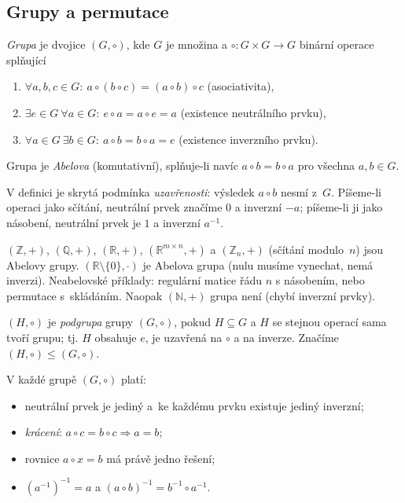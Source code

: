 \documentclass[11pt,a4paper]{article}
\begin{document}
\subsection{Grupy a permutace}

\begin{definice}[Grupa]
\emph{Grupa} je dvojice $(G,\circ)$, kde $G$ je množina a $\circ:G\times G\to G$ binární operace splňující
\begin{enumerate}[label=(\arabic*)]
  \item $\forall a,b,c\in G:\ a\circ(b\circ c)=(a\circ b)\circ c$ \quad (asociativita),
  \item $\exists e\in G\ \forall a\in G:\ e\circ a=a\circ e=a$ \quad (existence neutrálního prvku),
  \item $\forall a\in G\ \exists b\in G:\ a\circ b=b\circ a=e$ \quad (existence inverzního prvku).
\end{enumerate}
Grupa je \emph{Abelova} (komutativní), splňuje-li navíc $a\circ b=b\circ a$ pro všechna $a,b\in G$.
\end{definice}

\begin{intuice}
V definici je skrytá podmínka \emph{uzavřenosti}: výsledek $a\circ b$ nesmí  z~$G$. Píšeme-li operaci jako sčítání, neutrální prvek značíme $0$ a inverzní $-a$; píšeme-li ji jako násobení, neutrální prvek je $1$ a inverzní $a^{-1}$.
\end{intuice}

\begin{priklad}
$(\mathbb{Z},+)$, $(\mathbb{Q},+)$, $(\mathbb{R},+)$, $(\mathbb{R}^{m\times n},+)$ a $(\mathbb{Z}_n,+)$ (sčítání modulo~$n$) jsou Abelovy grupy. $(\mathbb{R}\setminus\{0\},\cdot)$ je Abelova grupa (nulu musíme vynechat, nemá inverzi). Neabelovské příklady: regulární matice řádu $n$ s násobením, nebo permutace s~skládáním. Naopak $(\mathbb{N},+)$ grupa není (chybí inverzní prvky).
\end{priklad}

\begin{definice}[Podgrupa]
$(H,\circ)$ je \emph{podgrupa} grupy $(G,\circ)$, pokud $H\subseteq G$ a $H$ se stejnou operací sama tvoří grupu; tj. $H$ obsahuje $e$, je uzavřená na $\circ$ a na inverze. Značíme $(H,\circ)\le(G,\circ)$.
\end{definice}

\begin{veta}
V každé grupě $(G,\circ)$ platí:
\begin{itemize}
  \item neutrální prvek je jediný a~ke každému prvku existuje jediný inverzní;
  \item \emph{krácení}: $a\circ c=b\circ c\Rightarrow a=b$;
  \item rovnice $a\circ x=b$ má právě jedno řešení;
  \item $(a^{-1})^{-1}=a$ a $(a\circ b)^{-1}=b^{-1}\circ a^{-1}$.
\end{itemize}
\end{veta}
\end{document}
